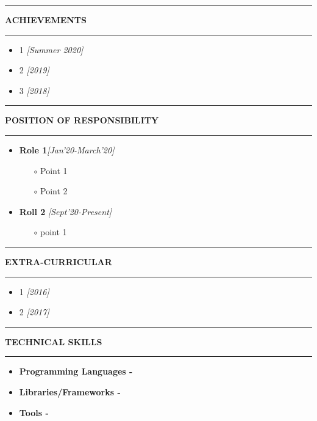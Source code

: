 \documentclass[10pt]{extarticle}
\begin{document}
\noindent\rule[0ex]{\linewidth}{0.5mm}
{ \textbf{\textsc{ACHIEVEMENTS}}}
\noindent\rule[1.5ex]{\linewidth}{0.5mm}
\begin{itemize}
     \item 1 \hfill\emph{[Summer 2020]}
    \item 2 \hfill\emph{[2019]}
    \item 3 \hfill\emph{[2018]}
\end{itemize}



\noindent\rule[0ex]{\linewidth}{0.5mm}
{\textbf{\textsc{POSITION OF RESPONSIBILITY}}}
\noindent\rule[1.5ex]{\linewidth}{0.5mm}
\begin{itemize}
    \item \textbf{Role 1}\hfill\emph{[Jan'20-March'20]}\\
    \begin{itemize}
        \item [$\circ$] Point 1
        \item[$\circ$] Point 2
    \end{itemize}
    \item \textbf{Roll 2} \hfill\emph{[Sept'20-Present]}
    \begin{itemize}
        \item [$\circ$] point 1
    \end{itemize}
\end{itemize}


\noindent\rule[0ex]{\linewidth}{0.5mm}
{\textbf{\textsc{EXTRA-CURRICULAR}}}
\noindent\rule[1.5ex]{\linewidth}{0.5mm}
\begin{itemize}
    \item  1 \hfill\emph{[2016]}
    \item 2 \hfill\emph{[2017]}
\end{itemize}



\noindent\rule[0ex]{\linewidth}{0.5mm}
{\textbf{\textsc{TECHNICAL SKILLS}}}
\noindent\rule[1.5ex]{\linewidth}{0.5mm}
\begin{itemize}
    \item \textbf{Programming Languages -}
    \item \textbf{Libraries/Frameworks -} 
    \item \textbf{Tools -} 
\end{itemize}
\end{document}
